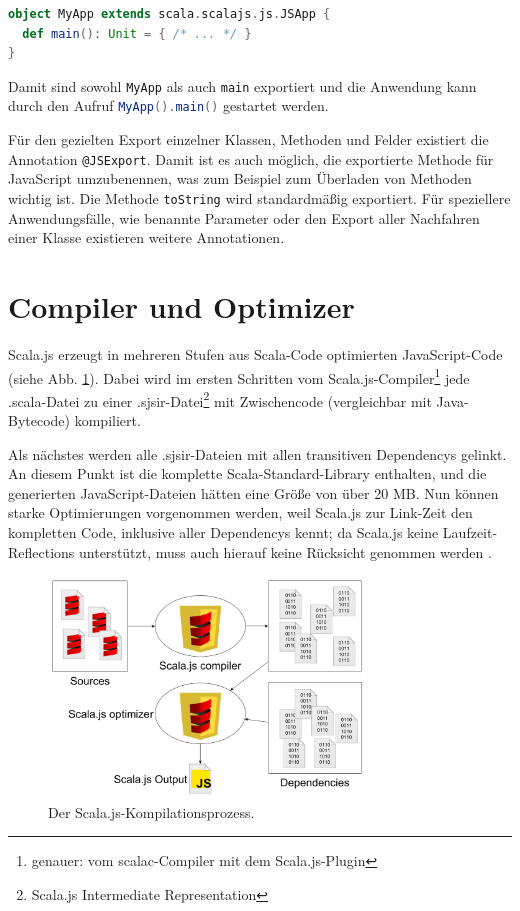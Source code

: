 \documentclass[a4paper, 12pt, hidelinks, listof=totoc, listoftables=totoc, bibliography=totoc]{scrreprt}
\newcommand{\scala}[1]{\lstinline[language=Scala, style=inline]|#1|}
\begin{document}
\begin{lstlisting}[language=Scala, style=snippet]
object MyApp extends scala.scalajs.js.JSApp {
  def main(): Unit = { /* ... */ }
}
\end{lstlisting}

Damit sind sowohl \scala{MyApp} als auch \scala{main} exportiert und die Anwendung kann durch den Aufruf \scala{MyApp().main()} gestartet werden.

Für den gezielten Export einzelner Klassen, Methoden und Felder existiert die Annotation \scala{@JSExport}. Damit ist es auch möglich, die exportierte Methode für JavaScript umzubenennen, was zum Beispiel zum Überladen von Methoden wichtig ist. Die Methode \scala{toString} wird standardmäßig exportiert. Für speziellere Anwendungsfälle, wie benannte Parameter oder den Export aller Nachfahren einer Klasse existieren weitere Annotationen. \cite{scalajs.DEJ}



\section{Compiler und Optimizer}\label{sec:compiler}

Scala.js erzeugt in mehreren Stufen aus Scala-Code optimierten JavaScript-Code (siehe Abb. \ref{fig:sjs-compilation}). Dabei wird im ersten Schritten vom Scala.js-Compiler\footnote{genauer: vom scalac-Compiler mit dem Scala.js-Plugin} jede .scala-Datei zu einer .sjsir-Datei\footnote{Scala.js Intermediate Representation} mit Zwischencode (vergleichbar mit Java-Bytecode) kompiliert.

Als nächstes werden alle .sjsir-Dateien mit allen transitiven Dependencys gelinkt. An diesem Punkt ist die komplette Scala-Standard-Library enthalten, und die generierten JavaScript-Dateien hätten eine Größe von über 20 MB. Nun können starke Optimierungen vorgenommen werden, weil Scala.js zur Link-Zeit den kompletten Code, inklusive aller Dependencys kennt; da Scala.js keine Laufzeit-Reflections unterstützt, muss auch hierauf keine Rücksicht genommen werden \cite[Folie 45 ff., Min. 36]{doeraene2015.SSP}.

\begin{figure}[!h]
    \centering
    \includegraphics[width=0.75\textwidth]{Doeraene2014-Scalajs-p17}
    \caption[Der Scala.js-Kompilationsprozess]{Der Scala.js-Kompilationsprozess. \cite[Folie 17]{doeraene2014.WHB}}
    \label{fig:sjs-compilation}
\end{figure}
\end{document}
